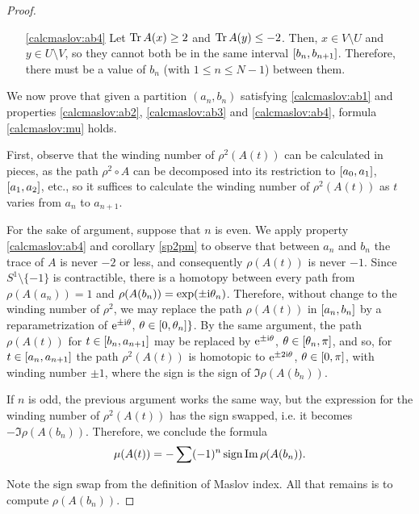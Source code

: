 \begin{proof}
\begin{itemize}
\item [\ref{calcmaslov:ab4}] Let $\operatorname{Tr} A(x) \geq 2$ and $\operatorname{Tr} A(y) \leq -2$. Then, $x \in V \setminus U$ and $y \in U \setminus V$, so they cannot both be in the same interval $\interval{b_n}{b_{n+1}}$. Therefore, there must be a value of $b_n$ (with $1 \leq n \leq N-1$) between them.
\end{itemize}

We now prove that given a partition $(a_n, b_n)$ satisfying \eqref{calcmaslov:ab1} and properties \ref{calcmaslov:ab2}, \ref{calcmaslov:ab3} and \ref{calcmaslov:ab4}, formula \eqref{calcmaslov:mu} holds.

First, observe that the winding number of $\rho^2(A(t))$ can be calculated in pieces, as the path $\rho^2 \circ A$ can be decomposed into its restriction to $\interval{a_0}{a_1}$, $\interval{a_1}{a_2}$, etc., so it suffices to calculate the winding number of $\rho^2(A(t))$ as $t$ varies from $a_n$ to $a_{n+1}$.

For the sake of argument, suppose that $n$ is even. We apply property \ref{calcmaslov:ab4} and corollary \ref{sp2pm} to observe that between $a_n$ and $b_n$ the trace of $A$ is never $-2$ or less, and consequently $\rho(A(t))$ is never $-1$. Since $S^1 \setminus \{-1\}$ is contractible, there is a homotopy between every path from $\rho(A(a_n)) = 1$ and $\rho(A(b_n)) = \exp(\pm \mathrm{i} \theta_n)$. Therefore, without change to the winding number of $\rho^2$, we may replace the path $\rho(A(t))$ in $\interval{a_n}{b_n}$ by a reparametrization of $\mathrm{e}^{\pm \mathrm{i} \theta}$, $\theta \in \interval 0 {\theta_n}\}$. By the same argument, the path $\rho(A(t))$ for $t \in \interval{b_n}{a_{n+1}}$ may be replaced by $\mathrm{e}^{\pm \mathrm{i} \theta}$, $\theta \in \interval{\theta_n}\pi$, and so, for $t \in \interval{a_n}{a_{n+1}}$ the path $\rho^2(A(t))$ is homotopic to $\mathrm{e}^{\pm 2 \mathrm{i} \theta}$, $\theta \in \interval 0 \pi$, with winding number $\pm 1$, where the sign is the sign of $\Im \rho(A(b_n))$.

If $n$ is odd, the previous argument works the same way, but the expression for the winding number of $\rho^2(A(t))$ has the sign swapped, i.e. it becomes $- \Im \rho(A(b_n))$. Therefore, we conclude the formula
\begin{equation}
\mu(A(t)) = -\sum (-1)^n \operatorname{sign} \operatorname{Im} \rho(A(b_n)).
\end{equation}

Note the sign swap from the definition of Maslov index. All that remains is to compute $\rho(A(b_n))$.


\end{proof}
